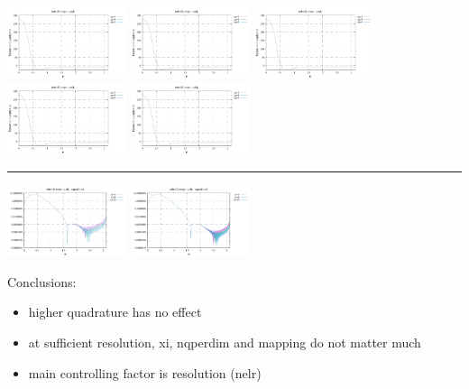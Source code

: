 \noindent
\includegraphics[width=3.5cm]{python_codes/fieldstone_152/RESULTS/exp3/d_t_64_m2}
\includegraphics[width=3.5cm]{python_codes/fieldstone_152/RESULTS/exp3/d_t_64_m3}
\includegraphics[width=3.5cm]{python_codes/fieldstone_152/RESULTS/exp3/d_t_64_m4}
\includegraphics[width=3.5cm]{python_codes/fieldstone_152/RESULTS/exp3/d_t_64_m5}
\includegraphics[width=3.5cm]{python_codes/fieldstone_152/RESULTS/exp3/d_t_64_m6}

\hrule

\includegraphics[width=3.5cm]{python_codes/fieldstone_152/RESULTS/exp3/vel_32_xi}
\includegraphics[width=3.5cm]{python_codes/fieldstone_152/RESULTS/exp3/vel_64_xi}

Conclusions:
\begin{itemize}
\item higher quadrature has no effect
\item at sufficient resolution, xi, nqperdim and mapping do not matter much 
\item main controlling factor is resolution (nelr)
\end{itemize}








